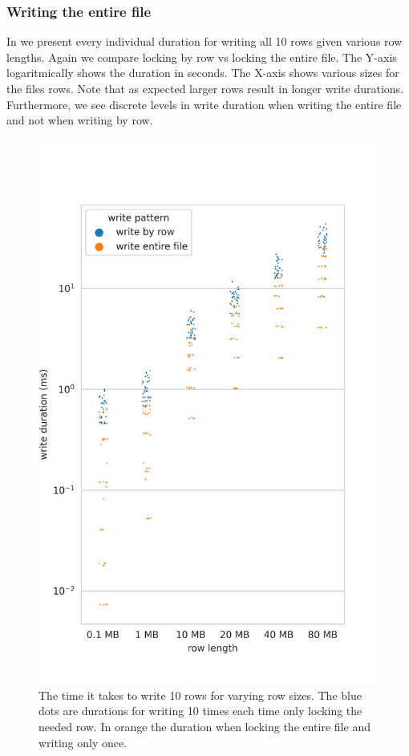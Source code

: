 \subsubsection{Writing the entire file}
In  we present every individual duration for writing all 10 rows given various row lengths. Again we compare locking by row vs locking the entire file. The Y-axis logaritmically shows the duration in seconds. The X-axis shows various sizes for the files rows. Note that as expected larger rows result in longer write durations. Furthermore, we see discrete levels in write duration when writing the entire file and not when writing by row.
%
\begin{figure}[htbp]
	\centering
	\includegraphics[height=\textheight]{../results/plots/range_vs_row_len.png}
	\caption{The time it takes to write 10 rows for varying row sizes. The blue dots are durations for writing 10 times each time only locking the needed row. In orange the duration when locking the entire file and writing only once.}
	\label{fig:rowlen}
\end{figure}%
